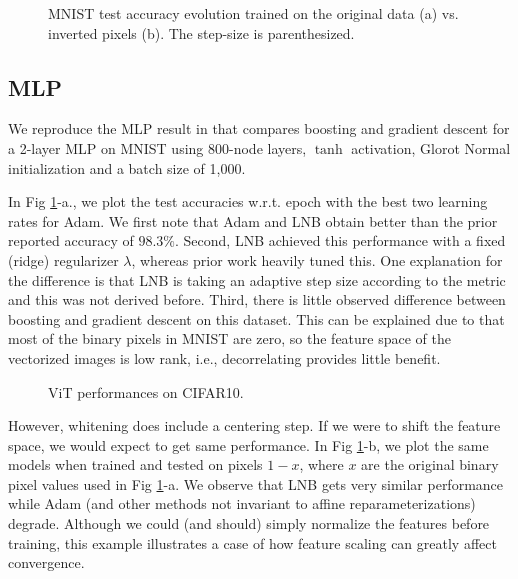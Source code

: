 \begin{figure}[t]
    \begin{center}
    \vskip -0.1in
    \caption{MNIST test accuracy evolution trained on the original data (a) vs. inverted pixels (b).
    The step-size is parenthesized.}
    \label{fig:mnist}
    \end{center}
\end{figure}


\subsection{MLP}
We reproduce the MLP result in \citet{grub2010} that compares boosting and gradient
descent for a 2-layer MLP on MNIST using 800-node layers, $\tanh$ activation,
Glorot Normal initialization and a batch size of 1,000.

In Fig \ref{fig:mnist}-a., we plot the test accuracies w.r.t. epoch with the best two learning rates for Adam.
We first note that Adam and LNB obtain better than the prior reported accuracy of $98.3\%$.
Second, LNB achieved this performance with a fixed (ridge) regularizer $\lambda$, whereas prior
work heavily tuned this.
One explanation for the difference is that LNB is taking an adaptive step size according to the metric
and this was not derived before.
Third, there is little observed difference between boosting and gradient descent on this dataset.
This can be explained due to that most of the binary pixels in MNIST are zero, so the feature space
of the vectorized images is low rank, i.e., decorrelating provides little benefit.

\begin{figure}[t]
    \begin{center}
    \caption{ViT performances on CIFAR10.}
    \label{fig:vit}
    \end{center}
\end{figure}

However, whitening does include a centering step. If we were to shift the feature space, we would expect
to get same performance. In Fig \ref{fig:mnist}-b, we plot the same models when trained and tested on pixels
$1-x$, where $x$ are the original binary pixel values used in Fig \ref{fig:mnist}-a. We observe that LNB gets very similar performance
while Adam (and other methods not invariant to affine reparameterizations) degrade. Although we could (and should)
simply normalize the features before training, this example illustrates a case of how feature scaling can
greatly affect convergence.

